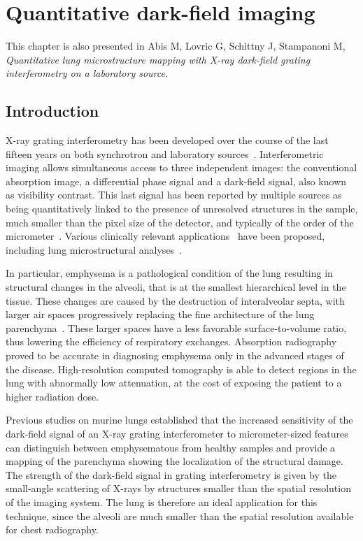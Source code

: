 \chapter{Quantitative dark-field imaging}\label{ch:lung-dark-field}
This chapter is also presented in Abis M, Lovric G, Schittny J, Stampanoni
M, \emph{Quantitative lung microstructure mapping with X-ray dark-field grating interferometry on a laboratory source}.
\section{Introduction}\label{sec:introduction}
X-ray grating interferometry has been developed over the course of the last
  fifteen years on both synchrotron and laboratory
sources~\parencite{David_2002,1347-4065-42-7B-L866,Weitkamp_2005,1347-4065-45-6R-5254,Pfeiffer2006}.
Interferometric imaging allows simultaneous access to three independent
images: the conventional absorption image, a differential phase signal and a
dark-field signal, also known as visibility contrast. This last signal has
been reported by multiple sources as being quantitatively linked to the
presence of unresolved structures in the sample, much smaller than the pixel
size of the detector, and typically of the order of the
micrometer~\parencite{Pfeiffer2008,Lynch:11,Yashiro:10}. Various clinically
relevant applications~\parencite{Wen_2009,Thilo2013} have been
proposed, including lung microstructural analyses~\parencite{Schleede17880,Meinel_2014,Meinel_2013,Yaroshenko_2013}.

In particular, emphysema is a pathological condition of the lung
resulting in structural changes in the alveoli, that is at the smallest
hierarchical level in the tissue. These changes are caused by the
destruction of interalveolar septa, with larger air spaces progressively
replacing the fine architecture of the lung
parenchyma~\parencite{Sharafkhaneh_2008}. These larger spaces have a less
favorable surface-to-volume ratio, thus lowering the efficiency
of respiratory exchanges. Absorption radiography proved to be accurate in
diagnosing emphysema only in the advanced stages of the disease. 
High-resolution computed tomography is able to detect regions in the lung
with abnormally low attenuation, at the cost of exposing the patient
to a higher radiation dose.

Previous studies on murine lungs established that the increased sensitivity of
the dark-field signal of an X-ray grating interferometer to micrometer-sized
features can distinguish between emphysematous from healthy samples and
provide a mapping of the parenchyma showing the localization of the
structural damage.
The strength of the dark-field signal in grating interferometry is
given by the small-angle scattering of X-rays by structures smaller than the
spatial resolution of the imaging system. The lung is therefore an ideal
application for this technique, since the alveoli are much
smaller than the spatial resolution available for chest radiography.

